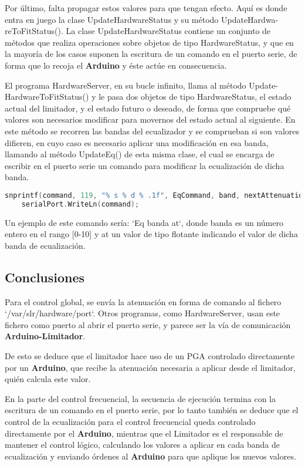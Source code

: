 \documentclass[]{article}
\begin{document}
Por último, falta propagar estos valores para que tengan efecto. Aquí es donde entra en juego la clase UpdateHardwareStatus y su método UpdateHardwa-reToFitStatus(). La clase UpdateHardwareStatus contiene un conjunto de métodos que realiza operaciones sobre objetos de tipo HardwareStatus, y que en la mayoría de los casos suponen la escritura de un comando en el puerto serie, de forma que lo recoja el \textbf{Arduino} y éste actúe en consecuencia.

El programa HardwareServer, en su bucle infinito, llama al método Update-HardwareToFitStatus() y le pasa dos objetos de tipo HardwareStatus, el estado actual del limitador, y el estado futuro o deseado, de forma que compruebe qué valores son necesarios modificar para movernos del estado actual al siguiente. En este método se recorren las bandas del ecualizador y se comprueban si son valores difieren, en cuyo caso es necesario aplicar una modificación en esa banda, llamando al método UpdateEq() de esta misma clase, el cual se encarga de escribir en el puerto serie un comando para modificar la ecualización de dicha banda.

\begin{lstlisting}[language=c++, caption=Escritura en puerto serie en UpdateEq()]
	snprintf(command, 119, "% s % d % .1f", EqCommand, band, nextAttenuation);
	serialPort.WriteLn(command);
\end{lstlisting}

Un ejemplo de este comando sería: `Eq banda at`, donde banda es un número entero en el rango [0-10] y at un valor de tipo flotante indicando el valor de dicha banda de ecualización.

\subsection{Conclusiones}
Para el control global, se envía la atenuación en forma de comando al fichero `/var/slr/hardware/port`. Otros programas, como HardwareServer, usan este fichero como puerto al abrir el puerto serie, y parece ser la vía de comunicación \textbf{Arduino-Limitador}.

De esto se deduce que el limitador hace uso de un PGA controlado directamente por un \textbf{Arduino}, que recibe la atenuación necesaria a aplicar desde el limitador, quién calcula este valor.

En la parte del control frecuencial, la secuencia de ejecución termina con la escritura de un comando en el puerto serie, por lo tanto también se deduce que el control de la ecualización para el control frecuencial queda controlado directamente por el \textbf{Arduino}, mientras que el Limitador es el responsable de mantener el control lógico, calculando los valores a aplicar en cada banda de ecualización y enviando órdenes al \textbf{Arduino} para que aplique los nuevos valores.
\end{document}
